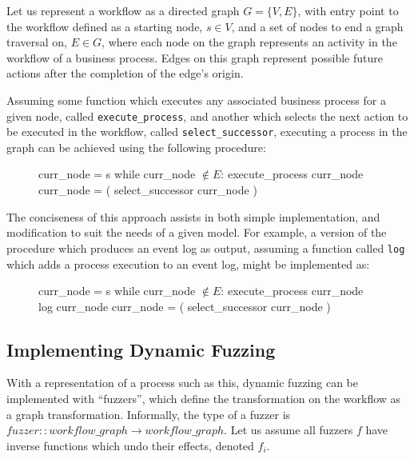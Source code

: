 \documentclass[draft,12pt]{llncs}  %
\begin{document}
Let us represent a workflow as a directed graph $G=\{V, E\}$, with entry point
to the workflow defined as a starting node, $s \in{} V$, and a set of nodes to end
a graph traversal on, $E \in G$, where each node on the graph
represents an activity in the workflow of a business process. Edges on this
graph represent possible future actions after the completion of the edge's origin.
\par

Assuming some function which executes any associated business process for a
given node, called \texttt{execute\_process}, and another which selects the next
action to be executed in the workflow, called \texttt{select\_successor}, executing
a process in the graph can be achieved using the following procedure:
\par

\begin{figure}[H]
  \begin{algorithm}
    curr_node = s
    while curr_node $\notin{} E$:
        execute_process curr_node
        curr_node = ( select_successor curr_node )
  \end{algorithm}
\end{figure}

The conciseness of this approach assists in both simple
implementation, and modification to suit the needs of a given model. For example,
a version of the procedure which produces an event log as output, assuming a
function called \texttt{log} which adds a process execution to an event log,
might be implemented as:

\begin{figure}[H]
  \begin{algorithm}
    curr_node = s
    while curr_node $\notin{} E$:
        execute_process curr_node
        log curr_node
        curr_node = ( select_successor curr_node )
  \end{algorithm}
\end{figure}
\subsection{Implementing Dynamic Fuzzing}
\label{subsec:example_implementation_details}
With a representation of a process such as this, dynamic fuzzing can be
implemented with ``fuzzers'', which define the transformation on the workflow as
a graph transformation. Informally, the type of a fuzzer is $fuzzer ::
workflow\_graph \rightarrow workflow\_graph$. Let us assume all fuzzers $f$ have
inverse functions which undo their effects, denoted $f_i$.
\par
\end{document}
